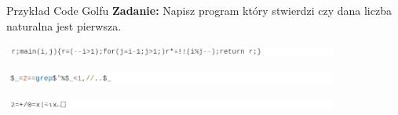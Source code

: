 \begin{frame}{Przykład Code Golfu}
    \textbf{Zadanie:} Napisz program który stwierdzi czy dana liczba naturalna jest pierwsza.

    \vspace*{0.5cm}

    \begin{tcolorbox}[title={C, 61 Bajtów {\color{blue} \hyperlink{frame:przypisy}{(10)}}}]
        {\includegraphics[width=11cm]{figures/primes_c.png}}
    \end{tcolorbox}

    \begin{tcolorbox}[title={Perl, 25 Bajtów {\color{blue} \hyperlink{frame:przypisy}{(11)}}}]
        {\includegraphics[width=11cm]{figures/primes_perl.png}}
    \end{tcolorbox}

    \begin{tcolorbox}[title={APL, 13 Bajtów {\color{blue} \hyperlink{frame:przypisy}{(12)}}}]
        {\includegraphics[width=11cm]{figures/primes_apl.png}}
    \end{tcolorbox}

\end{frame}
